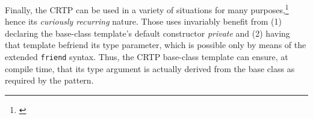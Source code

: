 Finally, the CRTP can be used in a variety of situations for many
purposes,\footnote{\cite{fluentcpp17}} hence its \emph{curiously recurring} nature. Those uses invariably
benefit from (1) declaring the base-class template's default constructor
\emph{private} and (2) having that template befriend its type parameter,
which is possible only by means of the extended \lstinline!friend! syntax.
Thus, the CRTP base-class template can ensure, at compile time, that its
type argument is actually derived from the base class as required by the
pattern.


